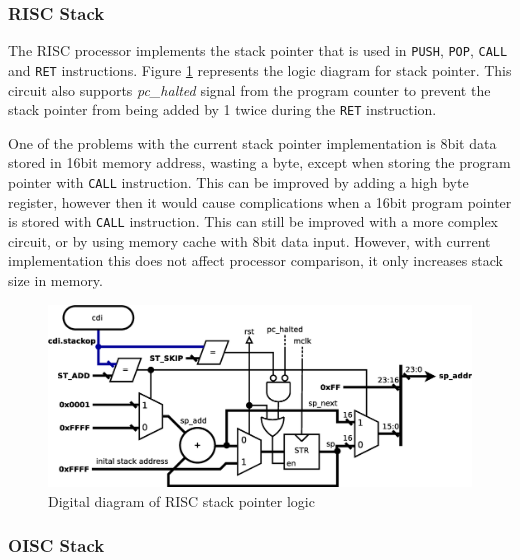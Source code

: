 \subsubsection{RISC Stack}
The RISC processor implements the stack pointer that is used in \texttt{PUSH}, \texttt{POP}, \texttt{CALL} and \texttt{RET} instructions. Figure \ref{fig:risc_stack} represents the logic diagram for stack pointer. This circuit also supports \textit{pc\_halted} signal from the program counter to prevent the stack pointer from being added by 1 twice during the \texttt{RET} instruction. 

One of the problems with the current stack pointer implementation is 8bit data stored in 16bit memory address, wasting a byte, except when storing the program pointer with \texttt{CALL} instruction. This can be improved by adding a high byte register, however then it would cause complications when a 16bit program pointer is stored with \texttt{CALL} instruction. This can still be improved with a more complex circuit, or by using memory cache with 8bit data input. However, with current implementation this does not affect processor comparison, it only increases stack size in memory.

\begin{figure}
	\centering
	\includegraphics[scale=0.4]{../resources/risc_stack.eps}
	\caption{Digital diagram of RISC stack pointer logic}
	\label{fig:risc_stack}
\end{figure}

\subsubsection{OISC Stack}

